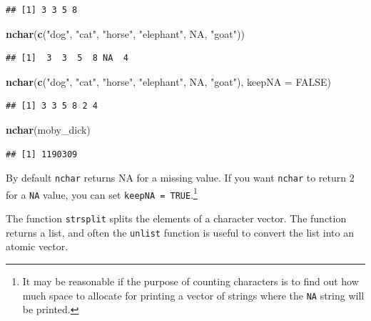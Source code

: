 \documentclass[
]{krantz}
\newenvironment{Shaded}{\begin{snugshade}}{\end{snugshade}}
\newcommand{\DataTypeTok}[1]{\textcolor[rgb]{0.13,0.29,0.53}{#1}}
\newcommand{\KeywordTok}[1]{\textcolor[rgb]{0.13,0.29,0.53}{\textbf{#1}}}
\newcommand{\NormalTok}[1]{#1}
\newcommand{\OtherTok}[1]{\textcolor[rgb]{0.56,0.35,0.01}{#1}}
\newcommand{\StringTok}[1]{\textcolor[rgb]{0.31,0.60,0.02}{#1}}
\begin{document}
\begin{verbatim}
## [1] 3 3 5 8
\end{verbatim}

\begin{Shaded}
\begin{Highlighting}[]
\KeywordTok{nchar}\NormalTok{(}\KeywordTok{c}\NormalTok{(}\StringTok{"dog"}\NormalTok{, }\StringTok{"cat"}\NormalTok{, }\StringTok{"horse"}\NormalTok{, }\StringTok{"elephant"}\NormalTok{, }\OtherTok{NA}\NormalTok{, }\StringTok{"goat"}\NormalTok{))}
\end{Highlighting}
\end{Shaded}

\begin{verbatim}
## [1]  3  3  5  8 NA  4
\end{verbatim}

\begin{Shaded}
\begin{Highlighting}[]
\KeywordTok{nchar}\NormalTok{(}\KeywordTok{c}\NormalTok{(}\StringTok{"dog"}\NormalTok{, }\StringTok{"cat"}\NormalTok{, }\StringTok{"horse"}\NormalTok{, }\StringTok{"elephant"}\NormalTok{, }\OtherTok{NA}\NormalTok{, }\StringTok{"goat"}\NormalTok{), }\DataTypeTok{keepNA =} \OtherTok{FALSE}\NormalTok{)}
\end{Highlighting}
\end{Shaded}

\begin{verbatim}
## [1] 3 3 5 8 2 4
\end{verbatim}

\begin{Shaded}
\begin{Highlighting}[]
\KeywordTok{nchar}\NormalTok{(moby\_dick)}
\end{Highlighting}
\end{Shaded}

\begin{verbatim}
## [1] 1190309
\end{verbatim}

By default \texttt{nchar} returns NA for a missing value. If you want \texttt{nchar} to return 2 for a \texttt{NA} value, you can set \texttt{keepNA\ =\ TRUE}.\footnote{It may be reasonable if the purpose of counting characters is to find out how much space to allocate for printing a vector of strings where the \texttt{NA} string will be printed.}

The function \texttt{strsplit} splits the elements of a character vector. The function returns a list, and often the \texttt{unlist} function is useful to convert the list into an atomic vector.
\end{document}
